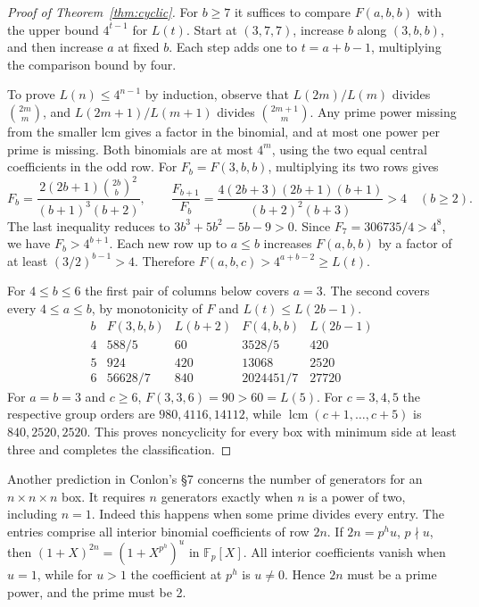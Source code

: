 \documentclass[11pt]{article}
\newcommand{\F}{\mathbb F}
\begin{document}
\begin{proof}[Proof of Theorem~\ref{thm:cyclic}]
For \(b\ge7\) it suffices to compare \(F(a,b,b)\) with the upper bound
\(4^{t-1}\) for \(L(t)\). Start at \((3,7,7)\), increase \(b\) along
\((3,b,b)\), and then increase \(a\) at fixed \(b\). Each step adds
one to \(t=a+b-1\), multiplying the comparison bound by four.

To prove \(L(n)\le4^{n-1}\) by induction, observe that
\(L(2m)/L(m)\) divides \(\binom{2m}{m}\), and
\(L(2m+1)/L(m+1)\) divides \(\binom{2m+1}{m}\). Any prime power
missing from the smaller lcm gives a factor in the binomial, and at most
one power per prime is missing. Both binomials are at most \(4^m\), using
the two equal central coefficients in the odd row.
For \(F_b=F(3,b,b)\), multiplying its two rows gives
\[
 F_b=\frac{2(2b+1)\binom{2b}{b}^2}{(b+1)^3(b+2)},\qquad
 \frac{F_{b+1}}{F_b}=
 \frac{4(2b+3)(2b+1)(b+1)}{(b+2)^2(b+3)}>4 \quad(b\ge2).
\]
The last inequality reduces to \(3b^3+5b^2-5b-9>0\).
Since \(F_7=306735/4>4^8\), we have \(F_b>4^{b+1}\).
Each new row up to \(a\le b\) increases \(F(a,b,b)\) by a factor of
at least \((3/2)^{b-1}>4\). Therefore \(F(a,b,c)>4^{a+b-2}\ge L(t)\).

For \(4\le b\le6\) the first pair of columns below covers \(a=3\).
The second covers every \(4\le a\le b\), by monotonicity of \(F\) and
\(L(t)\le L(2b-1)\).
\[
\begin{array}{c|rr|rr}
 b &F(3,b,b)&L(b+2)&F(4,b,b)&L(2b-1)\\ \hline
 4&588/5&60&3528/5&420\\
 5&924&420&13068&2520\\
 6&56628/7&840&2024451/7&27720
\end{array}
\]
For \(a=b=3\) and \(c\ge6\), \(F(3,3,6)=90>60=L(5)\).
For \(c=3,4,5\) the respective group orders are \(980,4116,14112\),
while \(\operatorname{lcm}(c+1,\ldots,c+5)\) is \(840,2520,2520\).
This proves noncyclicity for every box with minimum side at least three
and completes the classification.
\end{proof}

Another prediction in Conlon's \S7 concerns the number of generators
for an \(n\times n\times n\) box. It requires \(n\) generators exactly
when \(n\) is a power of two, including \(n=1\). Indeed this happens
when some prime divides every entry. The entries comprise all interior
binomial coefficients of row \(2n\). If \(2n=p^h u\), \(p\nmid u\),
then \((1+X)^{2n}=(1+X^{p^h})^u\) in \(\F_p[X]\). All interior
coefficients vanish when \(u=1\), while for \(u>1\) the coefficient at
\(p^h\) is \(u\ne0\). Hence \(2n\) must be a prime power, and the prime must be 2.
\end{document}
